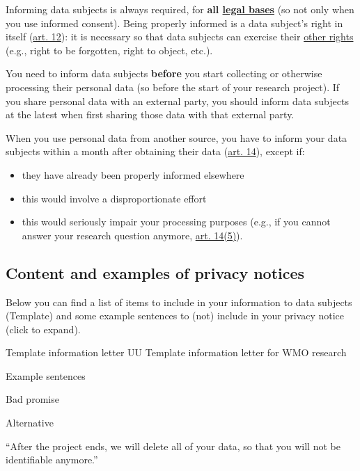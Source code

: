 \documentclass[
]{book}
\providecommand{\tightlist}{%
  \setlength{\itemsep}{0pt}\setlength{\parskip}{0pt}}
\begin{document}
Informing data subjects is always required, for \textbf{all \protect\hyperlink{legal-basis}{legal bases}}
(so not only when you use informed consent). Being properly informed is a data
subject's right in itself (\href{https://gdpr-info.eu/art-12-gdpr/}{art. 12}):
it is necessary so that data subjects can exercise their \protect\hyperlink{data-subject-rights}{other rights}
(e.g., right to be forgotten, right to object, etc.).

You need to inform data subjects \textbf{before} you start collecting or otherwise
processing their personal data (so before the start of your research project).
If you share personal data with an external party, you should inform data
subjects at the latest when first sharing those data with that external party.

When you use personal data from another source, you have to inform your data
subjects within a month after obtaining their data
(\href{https://gdpr-info.eu/art-14-gdpr/}{art. 14}), except if:

\begin{itemize}
\tightlist
\item
  they have already been properly informed elsewhere
\item
  this would involve a disproportionate effort
\item
  this would seriously impair your processing purposes (e.g., if you cannot
  answer your research question anymore,
  \href{https://gdpr-info.eu/art-14-gdpr/}{art. 14(5)}).
\end{itemize}

\hypertarget{content-and-examples-of-privacy-notices}{%
\subsection{Content and examples of privacy notices}\label{content-and-examples-of-privacy-notices}}

Below you can find a list of items to include in your information to data
subjects (Template) and some example sentences to (not) include in your privacy
notice (click to expand).

Template information letter UU
Template information letter for WMO research

Example sentences

Bad promise

Alternative

``After the project ends, we will delete all of your data, so that you will not be identifiable anymore.''
\end{document}
